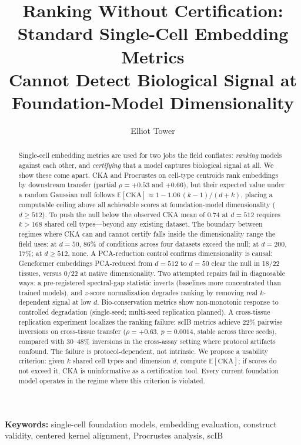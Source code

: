 \documentclass[11pt]{article}
\title{Ranking Without Certification: Standard Single-Cell Embedding Metrics\\
Cannot Detect Biological Signal at Foundation-Model Dimensionality}
\author{Elliot Tower}
\affil{Independent Researcher \\ \texttt{elliot@elliottower.ai}}
\date{}
\begin{document}
\linenumbers
\maketitle

\begin{abstract}
Single-cell embedding metrics are used for two jobs the field conflates:
\emph{ranking} models against each other, and \emph{certifying} that a
model captures biological signal at all. We show these come apart. CKA
and Procrustes on cell-type centroids rank embeddings by downstream
transfer (partial $\rho = +0.53$ and $+0.66$), but their expected value
under a random Gaussian null follows $\mathbb{E}[\mathrm{CKA}] \approx
1 - 1.06\,(k{-}1)/(d{+}k)$, placing a computable ceiling above all
achievable scores at foundation-model dimensionality ($d \geq 512$). To
push the null below the observed CKA mean of 0.74 at $d = 512$ requires
$k > 168$ shared cell types---beyond any existing dataset. The boundary
between regimes where CKA can and cannot certify falls inside the
dimensionality range the field uses: at $d = 50$, 86\% of conditions
across four datasets exceed the null; at $d = 200$, 17\%; at
$d \geq 512$, none. A PCA-reduction control confirms dimensionality is
causal: Geneformer embeddings PCA-reduced from $d = 512$ to $d = 50$
clear the null in 18/22 tissues, versus 0/22 at native dimensionality.
Two attempted repairs fail in diagnosable ways: a pre-registered
spectral-gap statistic inverts (baselines more concentrated than trained
models), and $z$-score normalization degrades ranking by removing real
$k$-dependent signal at low $d$. Bio-conservation metrics show
non-monotonic response to controlled degradation (single-seed;
multi-seed replication planned). A cross-tissue replication experiment
localizes the ranking failure: scIB metrics achieve 22\% pairwise
inversions on cross-tissue transfer ($\rho = +0.63$, $p = 0.0014$,
stable across three seeds), compared with 30--48\% inversions in the
cross-assay setting where protocol artifacts confound. The failure is
protocol-dependent, not intrinsic. We propose a usability criterion:
given $k$ shared cell types and dimension $d$, compute
$\mathbb{E}[\mathrm{CKA}]$; if scores do not exceed it, CKA is
uninformative as a certification tool. Every current foundation model
operates in the regime where this criterion is violated.
\end{abstract}

\noindent\textbf{Keywords:} single-cell foundation models, embedding evaluation, construct validity, centered kernel alignment, Procrustes analysis, scIB
\end{document}
